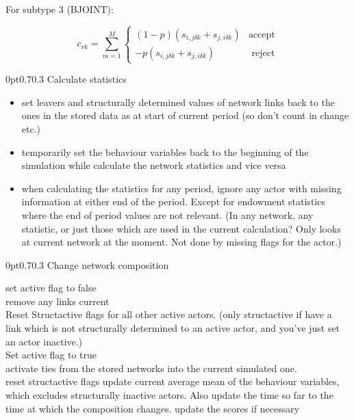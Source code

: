 \documentclass[12pt,a4paper]{article}
\makeatletter
\renewcommand{\=}{\,=\,}
\newcommand{\+}{\,+\,}
\renewcommand{\subsection}{\@startsection{subsection}{2}
                {0pt}{0.7\baselineskip}{0.3\baselineskip}
                {\sffamily} }
\makeatother
\begin{document}
For subtype 3 (BJOINT):

$$
c_{rk}= \sum_{m=1}^M  \begin{cases}
(1-p)(s_{i,j\delta k} + s_{j,i\delta k} ) & \text{accept}\\
-p (s_{i,j\delta k} + s_{j,i\delta k}) & \text{ reject}
\end{cases}
$$

\subsection{Calculate statistics}
\label{sec:stats}
\begin{itemize}
\item set leavers and structurally determined values of
  network links back to the ones in the stored data as at
    start of current period (so don't count in change
  etc.)
\item temporarily set the behaviour variables back to the beginning
of the simulation while calculate the network statistics and vice
versa
\item when calculating the statistics for any period, ignore any actor with
  missing information at either end of the period. Except for endowment
  statistics where the end of period values are not relevant.  (In any network,
  any statistic, or just those which are used in the current calculation? Only
  looks at current network at the moment. Not done by missing flags for the
  actor.)
\end{itemize}
\subsection{Change network composition}
\label{sec:cc}
\begin{algorithmic}
\STATE set active flag  to false\\
 remove any links current\\
Reset Structactive flags for all other active
  actors. (only structactive if have a link which is not structurally
  determined to an active actor, and you've just set an actor
  inactive.)\\
\STATE Set active flag to true\\
activate ties from the stored networks into
  the current simulated one.\\
 reset structactive flags
\ENDIF
\STATE update current average mean of the behaviour variables, which excludes
structurally inactive actors. Also update the time so far to the time at which
the composition changes.
\STATE update the scores if necessary
\end{algorithmic}
\end{document}
